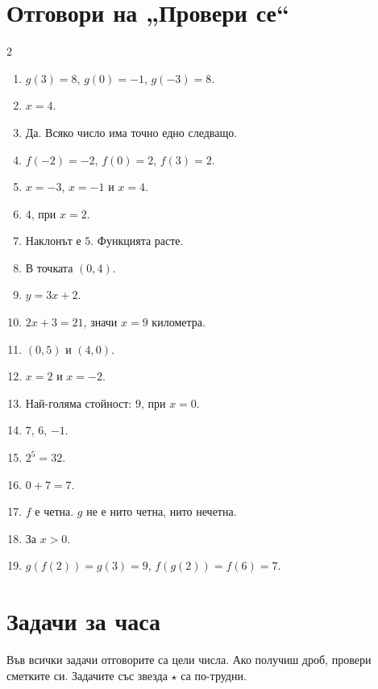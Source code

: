 \documentclass[11pt,a4paper]{article}
\newcommand{\st}{\textcolor{corange}{$\star$}}
\begin{document}
\needspace{7cm}
\section*{Отговори на „Провери се“}\label{sec:answers}
{\small
\begin{multicols}{2}
\begin{enumerate}[label=\textbf{\arabic*.},leftmargin=2em]
  \item $g(3)=8$, $g(0)=-1$, $g(-3)=8$.
  \item $x=4$.
  \item Да. Всяко число има точно едно следващо.
  \item $f(-2)=-2$, $f(0)=2$, $f(3)=2$.
  \item $x=-3$, $x=-1$ и $x=4$.
  \item $4$, при $x=2$.
  \item Наклонът е $5$. Функцията расте.
  \item В точката $(0,4)$.
  \item $y=3x+2$.
  \item $2x+3=21$, значи $x=9$ километра.
  \item $(0,5)$ и $(4,0)$.
  \item $x=2$ и $x=-2$.
  \item Най-голяма стойност: $9$, при $x=0$.
  \item $7$, \; $6$, \; $-1$.
  \item $2^5=32$.
  \item $0+7=7$.
  \item $f$ е четна. $g$ не е нито четна, нито нечетна.
  \item За $x>0$.
  \item $g(f(2))=g(3)=9$, \; $f(g(2))=f(6)=7$.
\end{enumerate}
\end{multicols}}
\newpage
\section*{Задачи за часа}

Във всички задачи отговорите са цели числа. Ако получиш дроб, провери сметките си.
Задачите със звезда \st{} са по-трудни.
\end{document}

